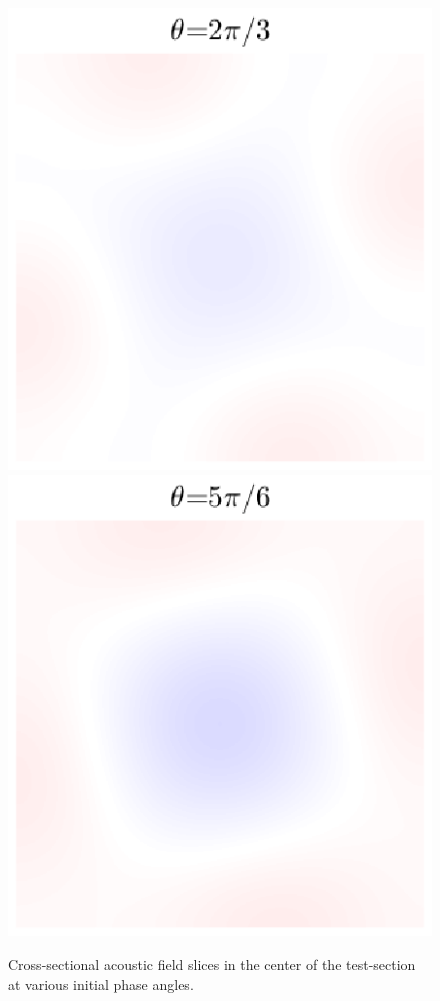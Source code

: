\begin{figure}
  \includegraphics[trim={0.3in 0.3in 0.3in 0.2in},clip]{../matlab/03_aero_optics_acoustics/tunnel_slices/tunnel_acoustic_against_0.6_8_0_2.0944_081.eps}
  \includegraphics[trim={0.3in 0.3in 0.3in 0.2in},clip]{../matlab/03_aero_optics_acoustics/tunnel_slices/tunnel_acoustic_against_0.6_8_0_2.618_081.eps}
  \caption{Cross-sectional acoustic field slices in the center of the test-section at various initial phase angles.}
  \label{fig:03_test_section_acoustics}
\end{figure}
